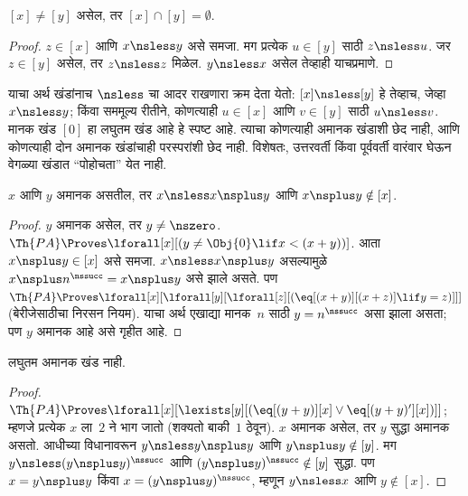 \documentclass[../../../include/open-logic-section]{subfiles}
\begin{document}
\begin{cor}
$[x] \neq [y]$ असेल, तर $[x] \cap [y] = \emptyset$.
\end{cor}

\begin{proof}
$z \in [x]$ आणि $x \nsless y$ असे समजा. मग प्रत्येक $u \in [y]$ साठी
$z \nsless u$. जर $z \in [y]$ असेल, तर $z \nsless z$ मिळेल.
$y \nsless x$ असेल तेव्हाही याचप्रमाणे.
\end{proof}

\begin{explain}
याचा अर्थ खंडांनाच $\nsless$ चा आदर राखणारा क्रम देता येतो:
$[x] \nsless [y]$ हे तेव्हाच, जेव्हा $x \nsless y$; किंवा सममूल्य रीतीने,
कोणत्याही $u \in [x]$ आणि $v \in [y]$ साठी $u \nsless v$. मानक खंड
$[0]$ हा लघुतम खंड आहे हे स्पष्ट आहे. त्याचा कोणत्याही अमानक खंडाशी छेद
नाही, आणि कोणत्याही दोन अमानक खंडांचाही परस्परांशी छेद नाही. विशेषतः,
उत्तरवर्ती किंवा पूर्ववर्ती वारंवार घेऊन वेगळ्या खंडात ``पोहोचता'' येत नाही.
\end{explain}

\begin{prop}
$x$ आणि $y$ अमानक असतील, तर $x \nsless x \nsplus y$ आणि
$x \nsplus y \notin [x]$.
\end{prop}

\begin{proof}
$y$ अमानक असेल, तर $y \neq \nszero$. $\Th{PA} \Proves
\lforall[x][(y \neq \Obj{0} \lif x < (x+y))]$. आता
$x \nsplus y \in [x]$ असे समजा. $x \nsless x \nsplus y$ असल्यामुळे
$x \nsplus n^\nssucc = x \nsplus y$ असे झाले असते. पण $\Th{PA} \Proves
\lforall[x][\lforall[y][\lforall[z][(\eq[(x+y)][(x+z)] \lif y = z)]]]$
(बेरीजेसाठीचा निरसन नियम). याचा अर्थ एखाद्या मानक~$n$ साठी
$y = n^\nssucc$ असा झाला असता; पण $y$ अमानक आहे असे गृहीत आहे.
\end{proof}

\begin{prop}
लघुतम अमानक खंड नाही.
\end{prop}

\begin{proof}
$\Th{PA} \Proves \lforall[x][\lexists[y][(\eq[(y+y)][x] \lor
      \eq[(y+y)'][x])]]$; म्हणजे प्रत्येक $x$ ला~$2$ ने भाग जातो
(शक्यतो बाकी~$1$ ठेवून). $x$ अमानक असेल, तर $y$ सुद्धा अमानक असतो.
आधीच्या विधानावरून $y \nsless y \nsplus y$ आणि
$y \nsplus y \notin [y]$. मग $y \nsless (y \nsplus y)^\nssucc$ आणि
$(y \nsplus y)^\nssucc \notin [y]$ सुद्धा. पण $x = y \nsplus y$ किंवा
$x = (y \nsplus y)^\nssucc$, म्हणून $y \nsless x$ आणि $y \notin [x]$.
\end{proof}
\end{document}
